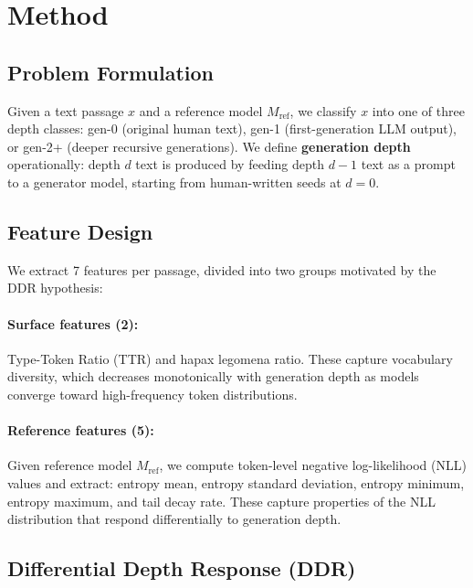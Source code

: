 \documentclass[11pt,a4paper]{article}
\begin{document}
\section{Method}
\label{sec:method}

\subsection{Problem Formulation}

Given a text passage $x$ and a reference model $M_\text{ref}$, we classify $x$ into one of three depth classes: gen-0 (original human text), gen-1 (first-generation LLM output), or gen-2+ (deeper recursive generations). We define \textbf{generation depth} operationally: depth $d$ text is produced by feeding depth $d{-}1$ text as a prompt to a generator model, starting from human-written seeds at $d{=}0$.

\subsection{Feature Design}

We extract 7 features per passage, divided into two groups motivated by the DDR hypothesis:

\paragraph{Surface features (2):} Type-Token Ratio (TTR) and hapax legomena ratio. These capture vocabulary diversity, which decreases monotonically with generation depth as models converge toward high-frequency token distributions.

\paragraph{Reference features (5):} Given reference model $M_\text{ref}$, we compute token-level negative log-likelihood (NLL) values and extract: entropy mean, entropy standard deviation, entropy minimum, entropy maximum, and tail decay rate. These capture properties of the NLL distribution that respond differentially to generation depth.

\subsection{Differential Depth Response (DDR)}
\end{document}

